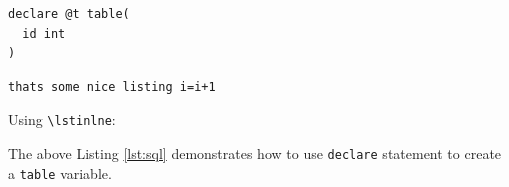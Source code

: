 \begin{lstlisting}[style=SQL,caption={SQL},label={lst:sql}]
declare @t table(
  id int
)
\end{lstlisting}

\begin{lstlisting}
thats some nice listing i=i+1
\end{lstlisting}

\noindent Using \verb+\lstinlne+:\par
The above Listing \ref{lst:sql} demonstrates how to use \lstinline[columns=fixed]{declare} statement to create a \lstinline{table} variable.
